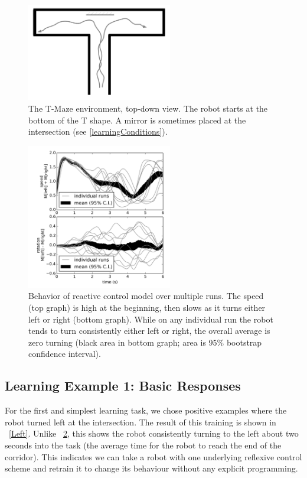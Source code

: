 \documentclass[conference]{IEEEtran}
\begin{document}
\begin{figure}[!t]
\centering
\includegraphics[width=2.5in]{tmazeRev.pdf}
\caption{The T-Maze environment, top-down view. The robot starts at the bottom of the T shape.
A mirror is sometimes placed at the intersection (see \ref{learningConditions}).}
\label{Tmaze}
\end{figure}


\begin{figure}[!t]
\centering
\includegraphics[width=2.5in]{basic/basic.png}
\caption{Behavior of reactive control model over multiple runs. The speed (top graph) is high at the beginning, then slows as it turns either left or right (bottom graph). While on any individual run the robot tends to turn consistently either left or right, the overall average is zero turning (black area in bottom graph; area is 95\% bootstrap confidence interval).}
\label{React}
\end{figure}

\subsection{Learning Example 1: Basic Responses}

For the first and simplest learning task, we chose positive examples
where the robot turned left at the intersection.
The result of this training is shown in \figurename~\ref{Left}. Unlike 
\figurename~\ref{React}, this shows the robot consistently turning to the left about 
two seconds into the task (the average time for the robot to reach the end of the corridor).
This indicates we can take a robot with one underlying reflexive control scheme
and retrain it to change its behaviour without any explicit programming.
\end{document}
